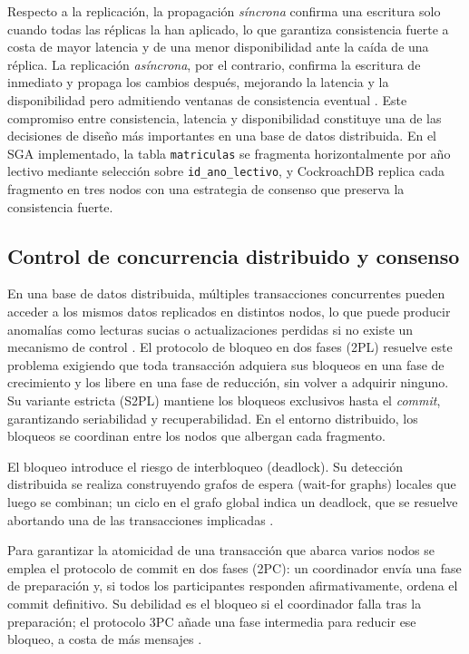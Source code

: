 \documentclass[10pt,a4paper]{article}
\begin{document}
Respecto a la replicación, la propagación \emph{síncrona} confirma una escritura solo
cuando todas las réplicas la han aplicado, lo que garantiza consistencia fuerte a costa
de mayor latencia y de una menor disponibilidad ante la caída de una réplica. La
replicación \emph{asíncrona}, por el contrario, confirma la escritura de inmediato y
propaga los cambios después, mejorando la latencia y la disponibilidad pero admitiendo
ventanas de consistencia eventual \cite{kleppmann2017}. Este compromiso entre
consistencia, latencia y disponibilidad constituye una de las decisiones de diseño más
importantes en una base de datos distribuida. En el SGA implementado, la tabla
\texttt{matriculas} se fragmenta horizontalmente por año lectivo mediante selección
sobre \texttt{id\_ano\_lectivo}, y CockroachDB replica cada fragmento en tres nodos con
una estrategia de consenso que preserva la consistencia fuerte.

\subsection{Control de concurrencia distribuido y consenso}
En una base de datos distribuida, múltiples transacciones concurrentes pueden acceder
a los mismos datos replicados en distintos nodos, lo que puede producir anomalías como
lecturas sucias o actualizaciones perdidas si no existe un mecanismo de control
\cite{ozsu2020}. El protocolo de bloqueo en dos fases (2PL) resuelve este problema
exigiendo que toda transacción adquiera sus bloqueos en una fase de crecimiento y los
libere en una fase de reducción, sin volver a adquirir ninguno. Su variante estricta
(S2PL) mantiene los bloqueos exclusivos hasta el \emph{commit}, garantizando
seriabilidad y recuperabilidad. En el entorno distribuido, los bloqueos se coordinan
entre los nodos que albergan cada fragmento.

El bloqueo introduce el riesgo de interbloqueo (deadlock). Su detección distribuida se
realiza construyendo grafos de espera (wait-for graphs) locales que luego se combinan;
un ciclo en el grafo global indica un deadlock, que se resuelve abortando una de las
transacciones implicadas \cite{ozsu2020}.

Para garantizar la atomicidad de una transacción que abarca varios nodos se emplea el
protocolo de commit en dos fases (2PC): un coordinador envía una fase de preparación y,
si todos los participantes responden afirmativamente, ordena el commit definitivo. Su
debilidad es el bloqueo si el coordinador falla tras la preparación; el protocolo 3PC
añade una fase intermedia para reducir ese bloqueo, a costa de más mensajes
\cite{vansteen2023}.
\end{document}
